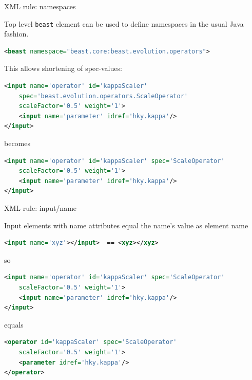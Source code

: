 \documentclass{beamer}
\theoremstyle{definition}
\begin{document}
\begin{frame}[containsverbatim]{XML rule: namespaces}


Top level {\tt beast} element can be used to define namespaces
in the usual Java fashion.

\begin{lstlisting}[language=XML]
    <beast namespace="beast.core:beast.evolution.operators">
\end{lstlisting}

This allows shortening of spec-values:

{\small
\begin{lstlisting}[language=XML]
<input name='operator' id='kappaScaler' 
    spec='beast.evolution.operators.ScaleOperator' 
    scaleFactor='0.5' weight='1'>
    <input name='parameter' idref='hky.kappa'/>
</input>
\end{lstlisting}
}

becomes

{\small
\begin{lstlisting}[language=XML]
<input name='operator' id='kappaScaler' spec='ScaleOperator' 
    scaleFactor='0.5' weight='1'>
    <input name='parameter' idref='hky.kappa'/>
</input>
\end{lstlisting}
}
\end{frame}

\begin{frame}[containsverbatim]{XML rule: input/name}

Input elements with name attributes equal the name's value as element name

\begin{lstlisting}[language=XML]
<input name='xyz'></input>  == <xyz></xyz>
\end{lstlisting}

so

{\small
\begin{lstlisting}[language=XML]
<input name='operator' id='kappaScaler' spec='ScaleOperator' 
    scaleFactor='0.5' weight='1'>
    <input name='parameter' idref='hky.kappa'/>
</input>
\end{lstlisting}
}

equals

{\small
\begin{lstlisting}[language=XML]
<operator id='kappaScaler' spec='ScaleOperator' 
    scaleFactor='0.5' weight='1'>
    <parameter idref='hky.kappa'/>
</operator>
\end{lstlisting}
}
\end{frame}
\end{document}
